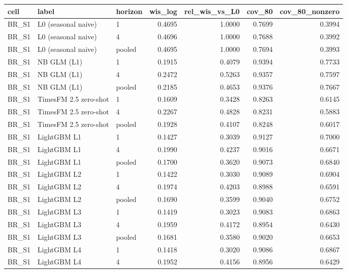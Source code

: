 \begin{tabular}{lllrrrr}
\toprule
cell & label & horizon & wis\_log & rel\_wis\_vs\_L0 & cov\_80 & cov\_80\_nonzero \\
\midrule
BR\_S1 & L0 (seasonal naive) & 1 & 0.4695 & 1.0000 & 0.7699 & 0.3994 \\
BR\_S1 & L0 (seasonal naive) & 4 & 0.4696 & 1.0000 & 0.7688 & 0.3992 \\
BR\_S1 & L0 (seasonal naive) & pooled & 0.4695 & 1.0000 & 0.7694 & 0.3993 \\
BR\_S1 & NB GLM (L1) & 1 & 0.1915 & 0.4079 & 0.9394 & 0.7733 \\
BR\_S1 & NB GLM (L1) & 4 & 0.2472 & 0.5263 & 0.9357 & 0.7597 \\
BR\_S1 & NB GLM (L1) & pooled & 0.2185 & 0.4653 & 0.9376 & 0.7667 \\
BR\_S1 & TimesFM 2.5 zero-shot & 1 & 0.1609 & 0.3428 & 0.8263 & 0.6145 \\
BR\_S1 & TimesFM 2.5 zero-shot & 4 & 0.2267 & 0.4828 & 0.8231 & 0.5883 \\
BR\_S1 & TimesFM 2.5 zero-shot & pooled & 0.1928 & 0.4107 & 0.8248 & 0.6017 \\
BR\_S1 & LightGBM L1 & 1 & 0.1427 & 0.3039 & 0.9127 & 0.7000 \\
BR\_S1 & LightGBM L1 & 4 & 0.1990 & 0.4237 & 0.9016 & 0.6671 \\
BR\_S1 & LightGBM L1 & pooled & 0.1700 & 0.3620 & 0.9073 & 0.6840 \\
BR\_S1 & LightGBM L2 & 1 & 0.1422 & 0.3030 & 0.9089 & 0.6904 \\
BR\_S1 & LightGBM L2 & 4 & 0.1974 & 0.4203 & 0.8988 & 0.6591 \\
BR\_S1 & LightGBM L2 & pooled & 0.1690 & 0.3599 & 0.9040 & 0.6752 \\
BR\_S1 & LightGBM L3 & 1 & 0.1419 & 0.3023 & 0.9083 & 0.6863 \\
BR\_S1 & LightGBM L3 & 4 & 0.1959 & 0.4172 & 0.8954 & 0.6430 \\
BR\_S1 & LightGBM L3 & pooled & 0.1681 & 0.3580 & 0.9020 & 0.6653 \\
BR\_S1 & LightGBM L4 & 1 & 0.1418 & 0.3020 & 0.9086 & 0.6867 \\
BR\_S1 & LightGBM L4 & 4 & 0.1952 & 0.4156 & 0.8956 & 0.6429 \\

\end{tabular}
